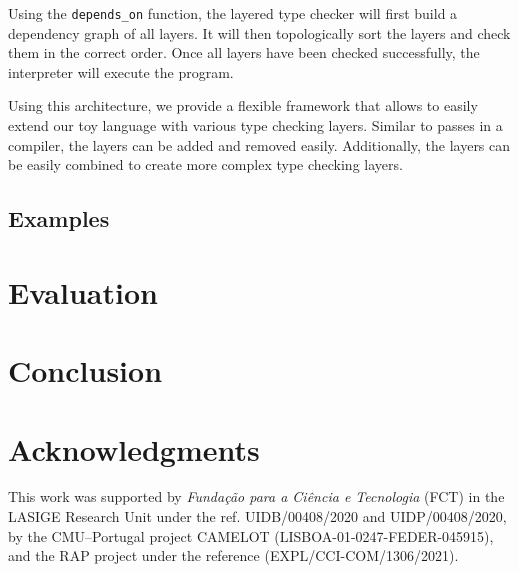 \documentclass[acmsmall, review, screen]{acmart}
\begin{document}
Using the \texttt{depends\_on} function, the layered type checker will first build a dependency graph of all layers. It will then topologically sort the layers and check them in the correct order. Once all layers have been checked successfully, the interpreter will execute the program.

Using this architecture, we provide a flexible framework that allows to easily extend our toy language with various type checking layers. Similar to passes in a compiler, the layers can be added and removed easily. Additionally, the layers can be easily combined to create more complex type checking layers. 

\subsection{Examples}
\label{ssec:examples}

\section{Evaluation}
\label{sec:evaluation}
\section{Conclusion}
\label{sec:conclusion}
\section{Acknowledgments}
\label{sec:acknowledgments}
This work was supported by \textit{Fundação para a Ciência e Tecnologia} (FCT) in the LASIGE Research Unit under the ref. UIDB/00408/2020 and UIDP/00408/2020, by the CMU--Portugal project CAMELOT (LISBOA-01-0247-FEDER-045915), and the RAP project under the reference (EXPL/CCI-COM/1306/2021).
\end{document}
